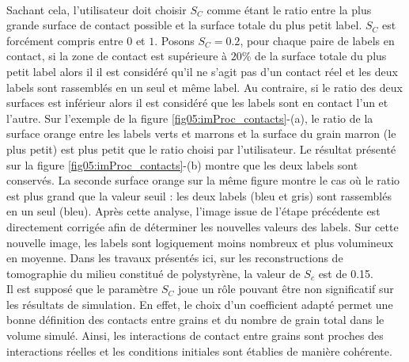 		\\Sachant cela, l'utilisateur doit choisir $S_C$ comme étant le ratio entre la plus grande surface de contact possible et la surface totale du plus petit label. $S_C$ est forcément compris entre $0$ et $1$. Posons $S_C=0.2$, pour chaque paire de labels en contact, si la zone de contact est supérieure à $20\%$ de la surface totale du plus petit label alors il il est considéré qu'il ne s'agit pas d'un contact réel et les deux labels sont rassemblés en un seul et même label. Au contraire, si le ratio des deux surfaces est inférieur alors il est considéré que les labels sont en contact l'un et l'autre. Sur l'exemple de la figure \ref{fig05:imProc_contacts}-(a), le ratio de la surface orange entre les labels verts et marrons et la surface du grain marron (le plus petit) est plus petit que le ratio choisi par l'utilisateur. Le résultat présenté sur la figure \ref{fig05:imProc_contacts}-(b) montre que les deux labels sont conservés. La seconde surface orange sur la même figure montre le cas où le ratio est plus grand que la valeur seuil : les deux labels (bleu et gris) sont rassemblés en un seul (bleu). Après cette analyse, l'image issue de l'étape précédente est directement corrigée afin de déterminer les nouvelles valeurs des labels. Sur cette nouvelle image, les labels sont logiquement moins nombreux et plus volumineux en moyenne. Dans les travaux présentés ici, sur les reconstructions de tomographie du milieu constitué de polystyrène, la valeur de $S_c$  est de \num{0.15}.
		\\Il est supposé que le paramètre $S_C$ joue un rôle pouvant être non significatif sur les résultats de simulation. En effet, le choix d'un coefficient adapté permet une bonne définition des contacts entre grains et du nombre de grain total dans le volume simulé. Ainsi, les interactions de contact entre grains sont proches des interactions réelles et les conditions initiales sont établies de manière cohérente.
